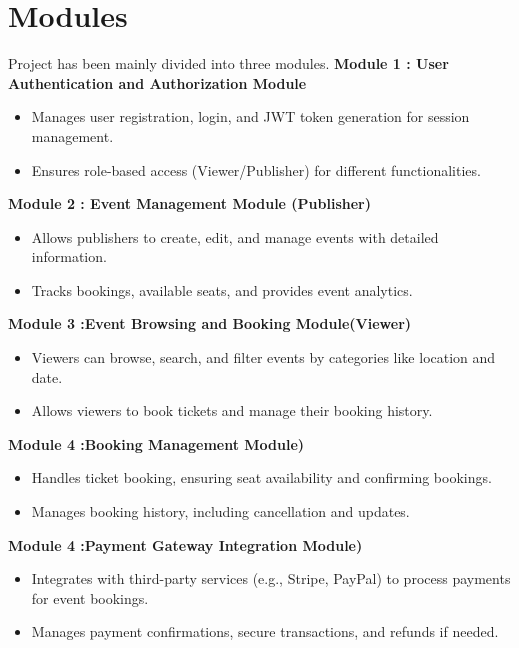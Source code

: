 \documentclass[twoside,a4paper,openright]{report} %
\begin{document}
\section{Modules}
\hspace{1.5cm}
Project has been mainly divided into three modules.
\newline \textbf{Module 1 : User Authentication and Authorization Module}
\begin{itemize}
	\item Manages user registration, login, and JWT token generation for session management.
	\item Ensures role-based access (Viewer/Publisher) for different functionalities.
\end{itemize}
\textbf{Module 2 : Event Management Module (Publisher)}
\begin{itemize}
	\item Allows publishers to create, edit, and manage events with detailed information.
	\item Tracks bookings, available seats, and provides event analytics.
\end{itemize}
\textbf{Module 3 :Event Browsing and Booking Module(Viewer)}
\begin{itemize}
	\item Viewers can browse, search, and filter events by categories like location and date.
	\item Allows viewers to book tickets and manage their booking history.
\end{itemize}
\textbf{Module 4 :Booking Management Module)}
\begin{itemize}
	\item Handles ticket booking, ensuring seat availability and confirming bookings.
	\item Manages booking history, including cancellation and updates.
\end{itemize}
\textbf{Module 4 :Payment Gateway Integration Module)}
\begin{itemize}
	\item Integrates with third-party services (e.g., Stripe, PayPal) to process payments for event bookings.
	\item Manages payment confirmations, secure transactions, and refunds if needed.
\end{itemize}
\end{document}
